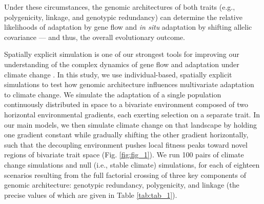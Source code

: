 \documentclass[9pt,twocolumn,twoside,lineno]{pnas-new}
\begin{document}
Under these circumstances, the genomic architectures of both traits
(e.g., polygenicity, linkage, and genotypic redundancy)
can determine the relative likelihoods of adaptation by gene flow
and \textit{in situ} adaptation by shifting
allelic covariance
\cite{aitken_whitlock,schiffers} --- and thus,
the overall evolutionary outcome.

Spatially explicit simulation is one of our strongest tools
for improving our understanding of the complex dynamics of gene flow and adaptation
under climate change \cite{capblancq_review}.
In this study, we use individual-based, spatially explicit simulations
to test how genomic architecture influences multivariate adaptation to climate change.
We simulate the adaptation of a single population
continuously distributed in space
to a bivariate environment composed of two horizontal 
environmental gradients, each exerting selection on a separate trait.
In our main models, we then simulate climate change on that landscape by holding one gradient 
constant while gradually shifting the other gradient horizontally, such that
the decoupling environment pushes local fitness peaks toward novel regions 
of bivariate trait space (Fig. \ref{fig:fig_1}).
We run 100 pairs of climate change simulations
and null (i.e., stable climate) simulations, for each of eighteen scenarios
resulting from the full factorial crossing of three key components
of genomic architecture: genotypic redundancy, polygenicity, and linkage
(the precise values of which are given in Table \ref{tab:tab_1}).
\end{document}
